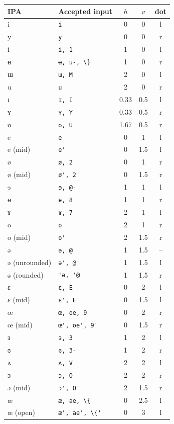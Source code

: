 \documentclass[a4paper,11pt]{article}
\begin{document}
\begin{table}[htbp]
	\small
	\begin{longtable}{llccc}
		\toprule
		IPA & Accepted input & $h$ & $v$ & dot\\
		\midrule\endhead
		i & \verb|i| & 0 & 0 & l\\
		y & \verb|y| & 0 & 0 & r\\
		ɨ & \verb|ɨ, 1| & 1 & 0 & l\\
		ʉ & \verb|ʉ, u-, \}| & 1 & 0 & r\\
		ɯ & \verb|ɯ, M| & 2 & 0 & l\\
		u & \verb|u| & 2 & 0 & r\\
		ɪ & \verb|ɪ, I| & 0.33 & 0.5 & l\\
		ʏ & \verb|ʏ, Y| & 0.33 & 0.5 & r\\
		ʊ & \verb|ʊ, U| & 1.67 & 0.5 & r\\
		e & \verb|e| & 0 & 1 & l\\
		e (mid) & \verb|e'| & 0 & 1.5 & l\\
		ø & \verb|ø, 2| & 0 & 1 & r\\
		ø (mid) & \verb|ø', 2'| & 0 & 1.5 & r\\
		ɘ & \verb|ɘ, @-| & 1 & 1 & l\\
		ɵ & \verb|ɵ, 8| & 1 & 1 & r\\
		ɤ & \verb|ɤ, 7| & 2 & 1 & l\\
		o & \verb|o| & 2 & 1 & r\\
		o (mid) & \verb|o'| & 2 & 1.5 & r\\
		ə & \verb|ə, @| & 1 & 1.5 & --\\
		ə (unrounded) & \verb|ə', @'| & 1 & 1.5 & l\\
		ə (rounded) & \verb|'ə, '@| & 1 & 1.5 & r\\
		ɛ & \verb|ɛ, E| & 0 & 2 & l\\
		ɛ (mid) & \verb|ɛ', E'| & 0 & 1.5 & l\\
		œ & \verb|œ, oe, 9| & 0 & 2 & r\\
		œ (mid) & \verb|œ', oe', 9'| & 0 & 1.5 & r\\
		ɜ & \verb|ɜ, 3| & 1 & 2 & l\\
		ɞ & \verb|ɞ, 3-| & 1 & 2 & r\\
		ʌ & \verb|ʌ, V| & 2 & 2 & l\\
		ɔ & \verb|ɔ, O| & 2 & 2 & r\\
		ɔ (mid) & \verb|ɔ', O'| & 2 & 1.5 & r\\
		æ & \verb|æ, ae, \{| & 0 & 2.5 & l\\
		æ (open) & \verb|æ', ae', \{'| & 0 & 3 & l\\

\end{longtable}
\end{table}
\end{document}
